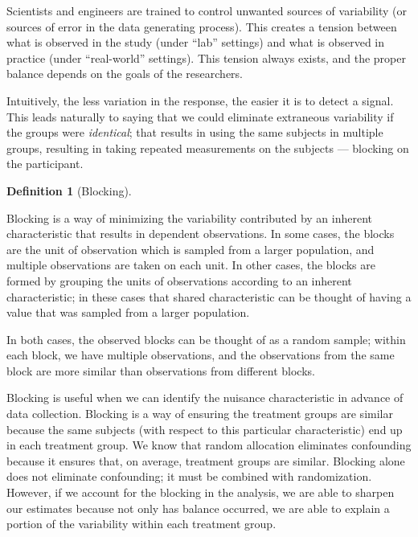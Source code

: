 \documentclass[
  letterpaper,
  DIV=11,
  numbers=noendperiod]{scrreprt}
\theoremstyle{definition}
\theoremstyle{definition}
\newtheorem{definition}{Definition}[chapter]
\theoremstyle{remark}
\begin{document}
\begin{tcolorbox}[enhanced jigsaw, bottomrule=.15mm, titlerule=0mm, bottomtitle=1mm, colback=white, coltitle=black, rightrule=.15mm, leftrule=.75mm, toprule=.15mm, toptitle=1mm, left=2mm, opacityback=0, colframe=quarto-callout-note-color-frame, breakable, title=\textcolor{quarto-callout-note-color}{\faInfo}\hspace{0.5em}{Tension between Lab Settings and Reality}, arc=.35mm, colbacktitle=quarto-callout-note-color!10!white, opacitybacktitle=0.6]

Scientists and engineers are trained to control unwanted sources of
variability (or sources of error in the data generating process). This
creates a tension between what is observed in the study (under ``lab''
settings) and what is observed in practice (under ``real-world''
settings). This tension always exists, and the proper balance depends on
the goals of the researchers.

\end{tcolorbox}

Intuitively, the less variation in the response, the easier it is to
detect a signal. This leads naturally to saying that we could eliminate
extraneous variability if the groups were \emph{identical}; that results
in using the same subjects in multiple groups, resulting in taking
repeated measurements on the subjects --- blocking on the participant.

\begin{definition}[Blocking]\protect\hypertarget{def-blocking}{}\label{def-blocking}

Blocking is a way of minimizing the variability contributed by an
inherent characteristic that results in dependent observations. In some
cases, the blocks are the unit of observation which is sampled from a
larger population, and multiple observations are taken on each unit. In
other cases, the blocks are formed by grouping the units of observations
according to an inherent characteristic; in these cases that shared
characteristic can be thought of having a value that was sampled from a
larger population.

In both cases, the observed blocks can be thought of as a random sample;
within each block, we have multiple observations, and the observations
from the same block are more similar than observations from different
blocks.

\end{definition}

Blocking is useful when we can identify the nuisance characteristic in
advance of data collection. Blocking is a way of ensuring the treatment
groups are similar because the same subjects (with respect to this
particular characteristic) end up in each treatment group. We know that
random allocation eliminates confounding because it ensures that, on
average, treatment groups are similar. Blocking alone does not eliminate
confounding; it must be combined with randomization. However, if we
account for the blocking in the analysis, we are able to sharpen our
estimates because not only has balance occurred, we are able to explain
a portion of the variability within each treatment group.
\end{document}
